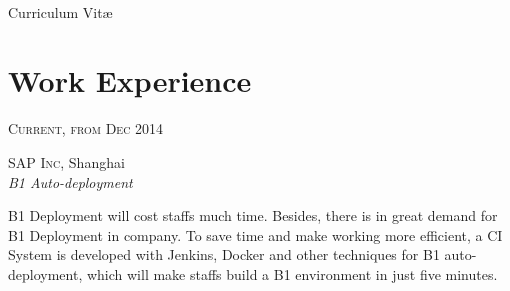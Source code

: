 \documentclass[UTF8,10pt]{article} %
\begin{document}
\color{text1} %


\par{\\ %
{\color{headings} Curriculum {Vit\ae}\\[15pt]\par} %
	

\begin{minipage}[t]{0.5\textwidth} %
\vspace{0pt} %
	

\section{Work Experience} 


{\raggedleft\textsc{Current, from Dec 2014}\par}

{\raggedright\large \textsc{SAP Inc}, Shanghai\\
\textit{B1 Auto-deployment}\\[8pt]}

\normalsize{B1 Deployment will cost staffs much time. Besides, there is in great demand for B1 Deployment 
in company. To save time and make working more efficient, a CI System is developed with Jenkins, Docker and
other techniques for B1 auto-deployment, which will make staffs build a B1 environment in just five minutes. }\\



\end{minipage}}
\end{document}

